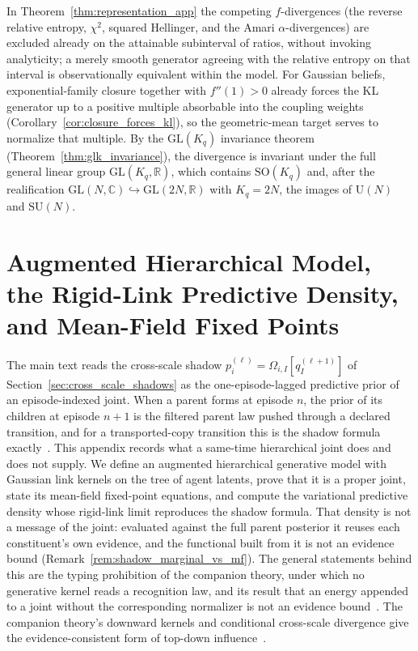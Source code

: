 \documentclass[11pt]{article}
\begin{document}
In Theorem~\ref{thm:representation_app} the competing $f$-divergences (the reverse relative entropy, $\chi^2$, squared Hellinger, and the Amari $\alpha$-divergences) are excluded already on the attainable subinterval of ratios, without invoking analyticity; a merely smooth generator agreeing with the relative entropy on that interval is observationally equivalent within the model. For Gaussian beliefs, exponential-family closure together with $f''(1) > 0$ already forces the KL generator up to a positive multiple absorbable into the coupling weights (Corollary~\ref{cor:closure_forces_kl}), so the geometric-mean target serves to normalize that multiple. By the $\mathrm{GL}(K_q)$ invariance theorem (Theorem~\ref{thm:glk_invariance}), the divergence is invariant under the full general linear group $\mathrm{GL}(K_q, \mathbb{R})$, which contains $\mathrm{SO}(K_q)$ and, after the realification $\mathrm{GL}(N, \mathbb{C}) \hookrightarrow \mathrm{GL}(2N, \mathbb{R})$ with $K_q = 2N$, the images of $\mathrm{U}(N)$ and $\mathrm{SU}(N)$.

\section{Augmented Hierarchical Model, the Rigid-Link Predictive Density, and Mean-Field Fixed Points}
\label{app:augmented_joint}

The main text reads the cross-scale shadow $p_i^{(\ell)} = \Omega_{i,I}[q_I^{(\ell+1)}]$ of Section~\ref{sec:cross_scale_shadows} as the one-episode-lagged predictive prior of an episode-indexed joint. When a parent forms at episode $n$, the prior of its children at episode $n+1$ is the filtered parent law pushed through a declared transition, and for a transported-copy transition this is the shadow formula exactly~\cite[Ch.~12]{DennisGaugeVFE2026}. This appendix records what a same-time hierarchical joint does and does not supply. We define an augmented hierarchical generative model with Gaussian link kernels on the tree of agent latents, prove that it is a proper joint, state its mean-field fixed-point equations, and compute the variational predictive density whose rigid-link limit reproduces the shadow formula. That density is not a message of the joint: evaluated against the full parent posterior it reuses each constituent's own evidence, and the functional built from it is not an evidence bound (Remark~\ref{rem:shadow_marginal_vs_mf}). The general statements behind this are the typing prohibition of the companion theory, under which no generative kernel reads a recognition law, and its result that an energy appended to a joint without the corresponding normalizer is not an evidence bound~\cite[Ch.~4]{DennisGaugeVFE2026}. The companion theory's downward kernels and conditional cross-scale divergence give the evidence-consistent form of top-down influence~\cite[Ch.~12]{DennisGaugeVFE2026}.
\end{document}
